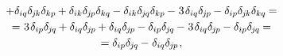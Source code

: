 \begin{equation*}
\begin{array}{c}
+ \delta_{iq} \delta_{\hspace{-0.1ex}j\hspace{-0.1ex}k} \delta_{kp} \hspace{-0.1ex}
+ \delta_{ik} \delta_{\hspace{-0.1ex}j\hspace{-0.1ex}p} \delta_{kq} \hspace{-0.1ex}
- \delta_{ik} \delta_{\hspace{-0.1ex}j\hspace{-0.1ex}q} \delta_{kp} \hspace{-0.1ex}
- \hspace{.1ex} 3 \hspace{.2ex} \delta_{iq} \delta_{\hspace{-0.1ex}j\hspace{-0.1ex}p} \hspace{-0.1ex}
- \delta_{ip} \delta_{\hspace{-0.1ex}j\hspace{-0.1ex}k} \delta_{kq} \hspace{-0.1ex} =
\\[.25em]
%
= \hspace{.1ex} 3 \hspace{.2ex} \delta_{ip} \delta_{\hspace{-0.1ex}j\hspace{-0.1ex}q} \hspace{-0.1ex}
+ \delta_{iq} \delta_{\hspace{-0.1ex}j\hspace{-0.1ex}p} \hspace{-0.1ex}
+ \delta_{iq} \delta_{\hspace{-0.1ex}j\hspace{-0.1ex}p} \hspace{-0.1ex}
- \delta_{ip} \delta_{\hspace{-0.1ex}j\hspace{-0.1ex}q} \hspace{-0.1ex}
- \hspace{.1ex} 3 \hspace{.2ex} \delta_{iq} \delta_{\hspace{-0.1ex}j\hspace{-0.1ex}p} \hspace{-0.1ex}
- \delta_{ip} \delta_{\hspace{-0.1ex}j\hspace{-0.1ex}q} \hspace{-0.1ex} =
\\[.25em]
%
= \delta_{ip} \delta_{\hspace{-0.1ex}j\hspace{-0.1ex}q} \hspace{-0.1ex}
- \hspace{.1ex} \delta_{iq} \delta_{\hspace{-0.1ex}j\hspace{-0.1ex}p}
\hspace{.2ex} ,
\end{array}\end{equation*}

